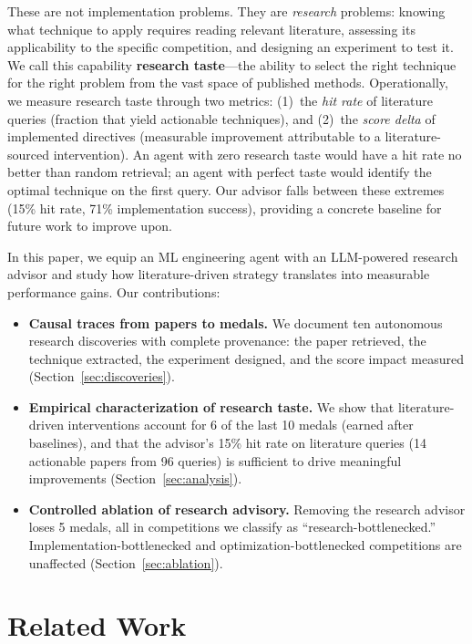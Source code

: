 \documentclass{article}
\begin{document}
These are not implementation problems. They are \emph{research} problems: knowing what technique to apply requires reading relevant literature, assessing its applicability to the specific competition, and designing an experiment to test it. We call this capability \textbf{research taste}---the ability to select the right technique for the right problem from the vast space of published methods. Operationally, we measure research taste through two metrics: (1)~the \emph{hit rate} of literature queries (fraction that yield actionable techniques), and (2)~the \emph{score delta} of implemented directives (measurable improvement attributable to a literature-sourced intervention). An agent with zero research taste would have a hit rate no better than random retrieval; an agent with perfect taste would identify the optimal technique on the first query. Our advisor falls between these extremes (15\% hit rate, 71\% implementation success), providing a concrete baseline for future work to improve upon.

In this paper, we equip an ML engineering agent with an LLM-powered research advisor and study how literature-driven strategy translates into measurable performance gains. Our contributions:

\begin{itemize}[leftmargin=1.5em,itemsep=2pt]
    \item \textbf{Causal traces from papers to medals.} We document ten autonomous research discoveries with complete provenance: the paper retrieved, the technique extracted, the experiment designed, and the score impact measured (Section~\ref{sec:discoveries}).
    \item \textbf{Empirical characterization of research taste.} We show that literature-driven interventions account for 6 of the last 10 medals (earned after baselines), and that the advisor's 15\% hit rate on literature queries (14 actionable papers from 96 queries) is sufficient to drive meaningful improvements (Section~\ref{sec:analysis}).
    \item \textbf{Controlled ablation of research advisory.} Removing the research advisor loses 5 medals, all in competitions we classify as ``research-bottlenecked.'' Implementation-bottlenecked and optimization-bottlenecked competitions are unaffected (Section~\ref{sec:ablation}).
\end{itemize}

\section{Related Work}
\label{sec:related}
\end{document}
